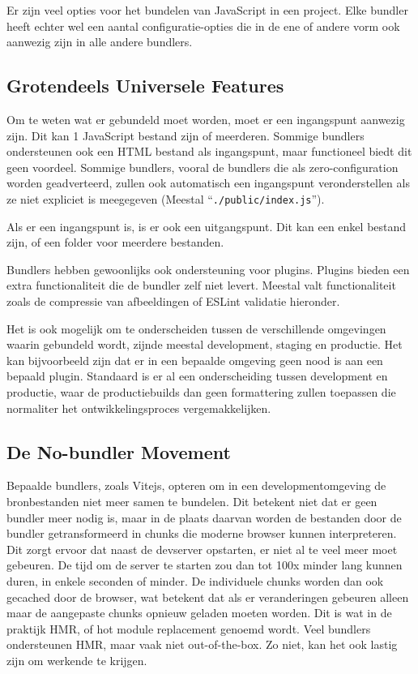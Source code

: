 Er zijn veel opties voor het bundelen van JavaScript in een project. Elke bundler heeft echter wel een aantal configuratie-opties die in de ene of andere vorm ook aanwezig zijn in alle andere bundlers.

\subsection{Grotendeels Universele Features}

Om te weten wat er gebundeld moet worden, moet er een ingangspunt aanwezig zijn. Dit kan 1 JavaScript bestand zijn of meerderen. Sommige bundlers ondersteunen ook een HTML bestand als ingangspunt, maar functioneel biedt dit geen voordeel. 
Sommige bundlers, vooral de bundlers die als zero-configuration worden geadverteerd, zullen ook automatisch een ingangspunt veronderstellen als ze niet expliciet is meegegeven (Meestal ``\lstinline{./public/index.js}'').

Als er een ingangspunt is, is er ook een uitgangspunt. Dit kan een enkel bestand zijn, of een folder voor meerdere bestanden.

Bundlers hebben gewoonlijks ook ondersteuning voor plugins. Plugins bieden een extra functionaliteit die de bundler zelf niet levert. Meestal valt functionaliteit zoals de compressie van afbeeldingen of ESLint validatie hieronder.

Het is ook mogelijk om te onderscheiden tussen de verschillende omgevingen waarin gebundeld wordt, zijnde meestal development, staging en productie. Het kan bijvoorbeeld zijn dat er in een bepaalde omgeving geen nood is aan een bepaald plugin. Standaard is er al een onderscheiding tussen development en productie, waar de productiebuilds dan geen formattering zullen toepassen die normaliter het ontwikkelingsproces vergemakkelijken.

\subsection{De No-bundler Movement}

Bepaalde bundlers, zoals Vitejs, opteren om in een developmentomgeving de bronbestanden niet meer samen te bundelen. Dit betekent niet dat er geen bundler meer nodig is, maar in de plaats daarvan worden de bestanden door de bundler getransformeerd in chunks die moderne browser kunnen interpreteren. Dit zorgt ervoor dat naast de devserver opstarten, er niet al te veel meer moet gebeuren. De tijd om de server te starten zou dan tot 100x minder lang kunnen duren, in enkele seconden of minder. De individuele chunks worden dan ook gecached door de browser, wat betekent dat als er veranderingen gebeuren alleen maar de aangepaste chunks opnieuw geladen moeten worden. Dit is wat in de praktijk HMR, of hot module replacement genoemd wordt. Veel bundlers ondersteunen HMR, maar vaak niet out-of-the-box. Zo niet, kan het ook lastig zijn om werkende te krijgen. 

